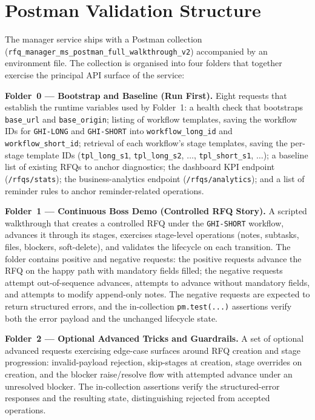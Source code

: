 \section{Postman Validation Structure}
\label{app:postman}

The manager service ships with a Postman collection (\texttt{rfq\_manager\_ms\_postman\_full\_walkthrough\_v2}) accompanied by an environment file. The collection is organised into four folders that together exercise the principal API surface of the service:

\textbf{Folder~0 --- Bootstrap and Baseline (Run First).} Eight requests that establish the runtime variables used by Folder~1: a health check that bootstraps \texttt{base\_url} and \texttt{base\_origin}; listing of workflow templates, saving the workflow IDs for \texttt{GHI-LONG} and \texttt{GHI-SHORT} into \texttt{workflow\_long\_id} and \texttt{workflow\_short\_id}; retrieval of each workflow's stage templates, saving the per-stage template IDs (\texttt{tpl\_long\_s1}, \texttt{tpl\_long\_s2}, $\ldots$, \texttt{tpl\_short\_s1}, $\ldots$); a baseline list of existing RFQs to anchor diagnostics; the dashboard KPI endpoint (\texttt{/rfqs/stats}); the business-analytics endpoint (\texttt{/rfqs/analytics}); and a list of reminder rules to anchor reminder-related operations.

\textbf{Folder~1 --- Continuous Boss Demo (Controlled RFQ Story).} A scripted walkthrough that creates a controlled RFQ under the \texttt{GHI-SHORT} workflow, advances it through its stages, exercises stage-level operations (notes, subtasks, files, blockers, soft-delete), and validates the lifecycle on each transition. The folder contains positive and negative requests: the positive requests advance the RFQ on the happy path with mandatory fields filled; the negative requests attempt out-of-sequence advances, attempts to advance without mandatory fields, and attempts to modify append-only notes. The negative requests are expected to return structured errors, and the in-collection \texttt{pm.test(...)} assertions verify both the error payload and the unchanged lifecycle state.

\textbf{Folder~2 --- Optional Advanced Tricks and Guardrails.} A set of optional advanced requests exercising edge-case surfaces around RFQ creation and stage progression: invalid-payload rejection, skip-stages at creation, stage overrides on creation, and the blocker raise/resolve flow with attempted advance under an unresolved blocker. The in-collection assertions verify the structured-error responses and the resulting state, distinguishing rejected from accepted operations.

